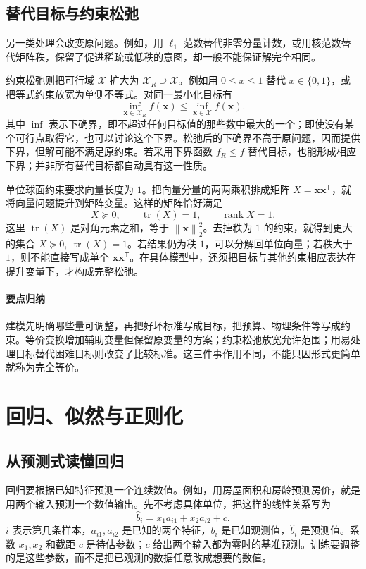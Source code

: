 \documentclass[UTF8,fontset=fandol,a4paper,12pt]{ctexart}
\newcommand{\rank}{\operatorname{rank}}
\newcommand{\vx}{\boldsymbol x}
\newcommand{\norm}[1]{\left\lVert#1\right\rVert}
\theoremstyle{definition}
\begin{document}
\subsection{替代目标与约束松弛}
另一类处理会改变原问题。例如，用 $\ell_1$ 范数替代非零分量计数，或用核范数替代矩阵秩，保留了促进稀疏或低秩的意图，却一般不能保证解完全相同。

约束松弛则把可行域 $\mathcal X$ 扩大为 $\mathcal X_R\supseteq\mathcal X$。例如用 $0\le x\le1$ 替代 $x\in\{0,1\}$，或把等式约束放宽为单侧不等式。对同一最小化目标有
\[
 \inf_{\vx\in\mathcal X_R}f(\vx)\le
 \inf_{\vx\in\mathcal X}f(\vx).
\]
其中 $\inf$ 表示下确界，即不超过任何目标值的那些数中最大的一个；即使没有某个可行点取得它，也可以讨论这个下界。松弛后的下确界不高于原问题，因而提供下界，但解可能不满足原约束。若采用下界函数 $f_R\le f$ 替代目标，也能形成相应下界；并非所有替代目标都自动具有这一性质。

单位球面约束要求向量长度为 $1$。把向量分量的两两乘积排成矩阵 $X=\vx\vx^{\mathsf T}$，就将向量问题提升到矩阵变量。这样的矩阵恰好满足
\[
 X\succeq0,\qquad\operatorname{tr}(X)=1,\qquad\rank X=1.
\]
这里 $\operatorname{tr}(X)$ 是对角元素之和，等于 $\norm{\vx}_2^2$。去掉秩为 $1$ 的约束，就得到更大的集合 $X\succeq0,\ \operatorname{tr}(X)=1$。若结果仍为秩 $1$，可以分解回单位向量；若秩大于 $1$，则不能直接写成单个 $\vx\vx^{\mathsf T}$。在具体模型中，还须把目标与其他约束相应表达在提升变量下，才构成完整松弛。

\paragraph{要点归纳}
建模先明确哪些量可调整，再把好坏标准写成目标，把预算、物理条件等写成约束。等价变换增加辅助变量但保留原变量的方案；约束松弛放宽允许范围；用易处理目标替代困难目标则改变了比较标准。这三件事作用不同，不能只因形式更简单就称为完全等价。

\section{回归、似然与正则化}\label{sec:regression}
\subsection{从预测式读懂回归}
回归要根据已知特征预测一个连续数值。例如，用房屋面积和房龄预测房价，就是用两个输入预测一个数值输出。先不考虑具体单位，把这样的线性关系写为
\[
 \widehat b_i=x_1a_{i1}+x_2a_{i2}+c.
\]
$i$ 表示第几条样本，$a_{i1},a_{i2}$ 是已知的两个特征，$b_i$ 是已知观测值，$\widehat b_i$ 是预测值。系数 $x_1,x_2$ 和截距 $c$ 是待估参数；$c$ 给出两个输入都为零时的基准预测。训练要调整的是这些参数，而不是把已观测的数据任意改成想要的数值。
\end{document}
